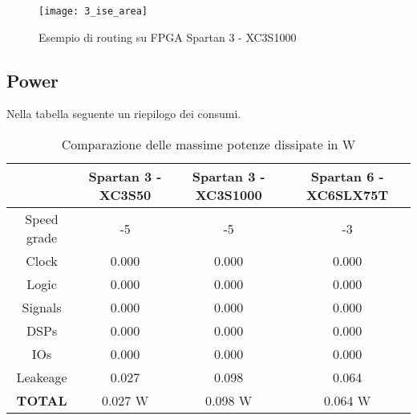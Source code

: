 \begin{figure}[H]
	\centering
	\texttt{[image: 3\_ise\_area]}
	\caption{Esempio di routing su FPGA Spartan 3 - XC3S1000}
	\label{fig:area_occupata}
\end{figure}

\subsection{Power}
Nella tabella seguente un riepilogo dei consumi.
\begin{table}[H]
	\centering
	\fontsize{10}{18}\selectfont
	\begin{tabular}{|p{30mm}|p{30mm}|p{30mm}|p{30mm}|}
		\hline
		\multicolumn{1}{|c|}{} &
		\multicolumn{1}{c|}{\textbf{Spartan 3 - XC3S50}} & 
		\multicolumn{1}{c|}{\textbf{Spartan 3 - XC3S1000}} & 
		\multicolumn{1}{c|}{\textbf{Spartan 6 - XC6SLX75T}} \\
		
		\hline
		\multicolumn{1}{|c|}{Speed grade} &
		\multicolumn{1}{c|}{-5} & 
		\multicolumn{1}{c|}{-5} & 
		\multicolumn{1}{c|}{-3} \\
		
		\hline
		\multicolumn{1}{|c|}{Clock} &
		\multicolumn{1}{c|}{0.000} & 
		\multicolumn{1}{c|}{0.000} & 
		\multicolumn{1}{c|}{0.000} \\
		
		\hline
		\multicolumn{1}{|c|}{Logic} &
		\multicolumn{1}{c|}{0.000} & 
		\multicolumn{1}{c|}{0.000} & 
		\multicolumn{1}{c|}{0.000} \\
		
		\hline
		\multicolumn{1}{|c|}{Signals} &
		\multicolumn{1}{c|}{0.000} & 
		\multicolumn{1}{c|}{0.000} & 
		\multicolumn{1}{c|}{0.000} \\
		
		\hline
		\multicolumn{1}{|c|}{DSPs} &
		\multicolumn{1}{c|}{0.000} & 
		\multicolumn{1}{c|}{0.000} & 
		\multicolumn{1}{c|}{0.000} \\
		
		\hline
		\multicolumn{1}{|c|}{IOs} &
		\multicolumn{1}{c|}{0.000} & 
		\multicolumn{1}{c|}{0.000} & 
		\multicolumn{1}{c|}{0.000} \\
		
		\hline
		\multicolumn{1}{|c|}{Leakeage} &
		\multicolumn{1}{c|}{0.027} & 
		\multicolumn{1}{c|}{0.098} & 
		\multicolumn{1}{c|}{0.064} \\
		
		\hline
		\multicolumn{1}{|c|}{\textbf{TOTAL}} &
		\multicolumn{1}{c|}{0.027 W} & 
		\multicolumn{1}{c|}{0.098 W} & 
		\multicolumn{1}{c|}{0.064 W} \\ \hline
		
	\end{tabular}
	\caption{Comparazione delle massime potenze dissipate in W}
\end{table}


